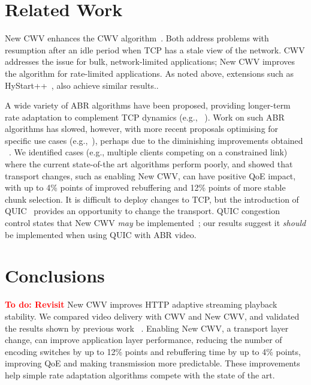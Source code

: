 \documentclass[10pt, acmlarge]{acmart}
\newcommand{\todo}[1]{\textbf{\textcolor{red}{To do: #1}}}
\begin{document}
\section{Related Work}
\label{sec:related}

New CWV enhances the CWV algorithm~\cite{rfc2861-2000-padhye-congestion-window-validation}.
Both address problems with resumption after
an idle period when TCP has a stale view of the network. CWV
addresses the issue for bulk, network-limited applications; New CWV improves
the algorithm for rate-limited applications.
As noted above, extensions such as HyStart++~\cite{draft-ietf-tcpm-hystartplusplus}, 
also achieve similar results..

A wide variety of ABR algorithms have been proposed, providing longer-term rate
adaptation to complement TCP dynamics (e.g.,
~\cite{Sun-2016-cs2p,Jiang-2012-improving-fairness-http-video-festive,Spiteri-2016-BOLA,
Huang-2015-A-buffer-based-approach-to-rate-adaptation-bba,
Spiteri-2019-from-theory-to-practice-sabre,Wang-2016-squad}).
Work on such ABR algorithms has slowed, however, with more recent proposals optimising for 
specific use cases (e.g.,~\cite{Karagkioules-2020-achieving-low-latency}), 
perhaps due to the diminishing improvements obtained
~\cite{Yin-2015-a-control-theoritic-approach}. We identified cases (e.g., multiple 
clients competing on a constrained link) where the current state-of-the art algorithms 
perform poorly, and showed that transport changes, such as enabling New CWV, can have 
positive QoE impact, with up to 4\% points of improved rebuffering and 12\% points of more 
stable chunk selection. 
It is difficult to deploy changes to TCP, but the introduction of QUIC~\cite{RFC9000}
provides an opportunity to change the transport. QUIC congestion control states that 
New CWV \emph{may} be implemented~\cite{RFC9002}; our results suggest it \emph{should}
be implemented when using QUIC with ABR video.

\section{Conclusions}
\label{sec:conclusion}

\todo{Revisit}
New CWV improves HTTP adaptive streaming playback stability. We compared video delivery 
with CWV and New CWV, and validated the results shown by previous work
~\cite{Nazir-2014-performance-evaluation-congestion-window-validation-dash-newcwv}.
Enabling New CWV, a transport layer change, can improve application layer performance,
reducing the number of encoding switches by up to 12\% points and rebuffering time by up to
4\% points, improving QoE and making transmission more predictable. These improvements 
help simple rate adaptation algorithms compete with the state of the art.  
\end{document}
